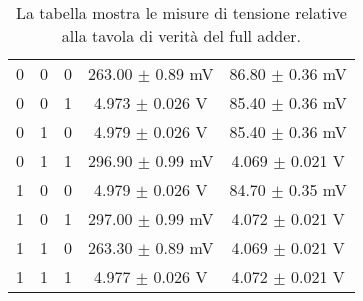\documentclass[a4paper,11pt]{article}
\begin{document}
	\begin{table}
		\centering
	\begin{tabular}{|c|c|c||c|c|}
		
		\hline
		\cellcolor{yellow} \text{A} & \cellcolor{yellow} \text{B}  & \cellcolor{yellow} \text{$C_i$} & \cellcolor{yellow} \text{$S$} & \cellcolor{yellow} \text{$C_O$} \\
		\hline
		0 & 0 & 0 & 263.00 $\pm$ 0.89 mV & 86.80 $\pm$ 0.36 mV \\
		0 & 0 & 1 & 4.973 $\pm$ 0.026 V & 85.40 $\pm$ 0.36 mV \\
		0 & 1 & 0 & 4.979 $\pm$ 0.026 V & 85.40 $\pm$ 0.36 mV \\
		0 & 1 & 1 & 296.90 $\pm$ 0.99 mV & 4.069 $\pm$ 0.021 V \\
		1 & 0 & 0 & 4.979 $\pm$ 0.026 V & 84.70 $\pm$ 0.35 mV \\
		1 & 0 & 1 & 297.00 $\pm$ 0.99 mV & 4.072 $\pm$ 0.021 V \\
		1 & 1 & 0 & 263.30 $\pm$ 0.89 mV & 4.069 $\pm$ 0.021 V\\
		1 & 1 & 1 & 4.977 $\pm$ 0.026 V & 4.072 $\pm$ 0.021 V \\
		\hline
	\end{tabular}
	\caption{La tabella mostra le misure di tensione relative alla tavola di verità del full adder.}
	\label{tab:fa_mis}	
	\end{table}
	
	
	
	
	
\end{document}

